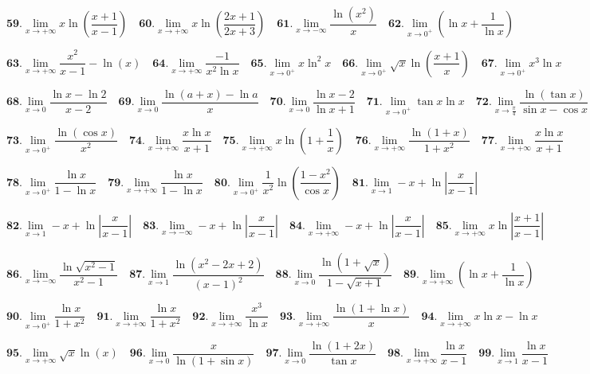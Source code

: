 \documentclass[12pt]{article}
\begin{document}
\[
\textbf{59.} \lim\limits_{x \to +\infty} x \ln\left(\frac{x+1}{x-1}\right) \quad  
\textbf{60.} \lim\limits_{x \to +\infty} x \ln\left(\frac{2x+1}{2x+3}\right) \quad 
\textbf{61.} \lim\limits_{x \to -\infty} \frac{\ln(x^2)}{x} \quad 
\textbf{62.} \lim\limits_{x \to 0^+} \left(\ln x + \frac{1}{\ln x}\right) 
\]

\[
\textbf{63.} \lim\limits_{x \to +\infty} \frac{x^2}{x-1} - \ln(x) \quad 
\textbf{64.} \lim\limits_{x \to +\infty} \frac{-1}{x^2 \ln x} \quad  
\textbf{65.} \lim\limits_{x \to 0^+} x \ln^2 x \quad  
\textbf{66.} \lim\limits_{x \to 0^+} \sqrt{x} \ln\left(\frac{x+1}{x}\right) \quad  
\textbf{67.} \lim\limits_{x \to 0^+} x^3 \ln x
\]

\[
\textbf{68.} \lim\limits_{x \to 0} \frac{\ln x - \ln 2}{x-2} \quad
\textbf{69.} \lim\limits_{x \to 0} \frac{\ln(a+x) - \ln a}{x} \quad 
\textbf{70.} \lim\limits_{x \to 0} \frac{\ln x - 2}{\ln x + 1} \quad 
\textbf{71.} \lim\limits_{x \to 0^+} \tan x \ln x \quad 
\textbf{72.} \lim\limits_{x \to \frac{\pi}{4}} \frac{\ln(\tan x)}{\sin x - \cos x}
\]

\[
\textbf{73.} \lim\limits_{x \to 0^+} \frac{\ln(\cos x)}{x^2} \quad
\textbf{74.} \lim\limits_{x \to +\infty} \frac{x \ln x}{x+1} \quad 
\textbf{75.} \lim\limits_{x \to +\infty} x \ln\left(1 + \frac{1}{x}\right) \quad 
\textbf{76.} \lim\limits_{x \to +\infty} \frac{\ln(1+x)}{1+x^2} \quad
\textbf{77.} \lim\limits_{x \to +\infty} \frac{x \ln x}{x+1} 
\]

\[
\textbf{78.} \lim\limits_{x \to 0^+} \frac{\ln x}{1 - \ln x} \quad
\textbf{79.} \lim\limits_{x \to +\infty} \frac{\ln x}{1 - \ln x} \quad 
\textbf{80.} \lim\limits_{x \to 0^+} \frac{1}{x^2}\ln\left(\frac{1 - x^2}{\cos x}\right) \quad 
\textbf{81.} \lim\limits_{x \to 1} -x + \ln\left|\frac{x}{x-1}\right| 
\]

\[  
\textbf{82.} \lim\limits_{x \to 1} -x + \ln\left|\frac{x}{x-1}\right| \quad 
\textbf{83.} \lim\limits_{x \to -\infty} -x + \ln\left|\frac{x}{x-1}\right| \quad
\textbf{84.} \lim\limits_{x \to +\infty} -x + \ln\left|\frac{x}{x-1}\right| \quad
\textbf{85.} \lim\limits_{x \to +\infty} x \ln\left|\frac{x+1}{x-1}\right|
\]

\[
\textbf{86.} \lim\limits_{x \to -\infty} \frac{\ln\sqrt{x^2 - 1}}{x^2 - 1} \quad
\textbf{87.} \lim\limits_{x \to 1} \frac{\ln(x^2 - 2x + 2)}{(x-1)^2} \quad 
\textbf{88.} \lim\limits_{x \to 0} \frac{\ln(1+\sqrt{x})}{1-\sqrt{x+1}} \quad 
\textbf{89.} \lim\limits_{x \to +\infty} \left(\ln x + \frac{1}{\ln x}\right) 
\]

\[
\textbf{90.} \lim\limits_{x \to 0^+} \frac{\ln x}{1+x^2} \quad 
\textbf{91.} \lim\limits_{x \to +\infty} \frac{\ln x}{1+x^2} \quad
\textbf{92.} \lim\limits_{x \to +\infty} \frac{x^3}{\ln x} \quad 
\textbf{93.} \lim\limits_{x \to +\infty} \frac{\ln(1+\ln x)}{x} \quad 
\textbf{94.} \lim\limits_{x \to +\infty} x \ln x - \ln x
\]
 
\[
\textbf{95.} \lim\limits_{x \to +\infty} \sqrt{x} \ln(x) \quad 
\textbf{96.} \lim\limits_{x \to 0} \frac{x}{\ln(1+\sin x)} \quad
\textbf{97.} \lim\limits_{x \to 0} \frac{\ln(1+2x)}{\tan x} \quad
\textbf{98.} \lim\limits_{x \to +\infty} \frac{\ln x}{x-1} \quad
\textbf{99.} \lim\limits_{x \to 1} \frac{\ln x}{x-1}
\]
\end{document}
